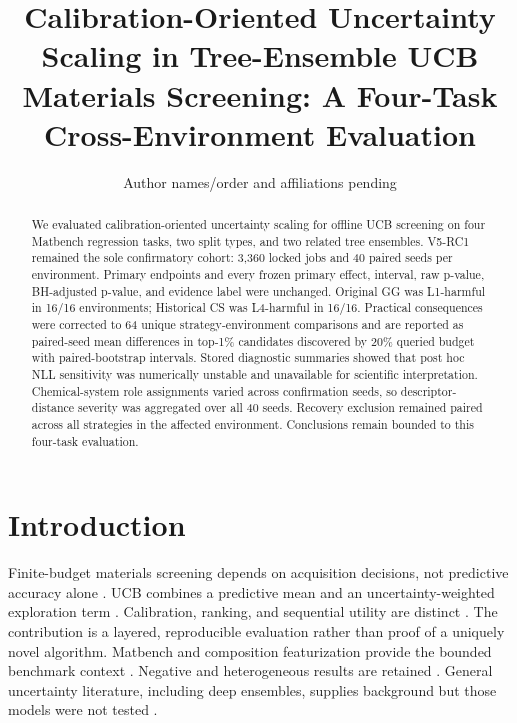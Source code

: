 \documentclass[10pt]{article}
\title{Calibration-Oriented Uncertainty Scaling in Tree-Ensemble UCB Materials Screening: A Four-Task Cross-Environment Evaluation}
\author{Author names/order and affiliations pending}
\date{}
\begin{document}
\maketitle
\begin{abstract}
We evaluated calibration-oriented uncertainty scaling for offline UCB screening
on four Matbench regression tasks, two split types, and two related tree
ensembles. V5-RC1 remained the sole confirmatory cohort: 3,360 locked jobs and
40 paired seeds per environment. Primary endpoints and every frozen primary
effect, interval, raw p-value, BH-adjusted p-value, and evidence label were
unchanged. Original GG was L1-harmful in 16/16 environments; Historical CS was
L4-harmful in 16/16. Practical consequences were corrected to 64 unique
strategy-environment comparisons and are reported as paired-seed mean
differences in top-1\% candidates discovered by 20\% queried budget with
paired-bootstrap intervals. Stored diagnostic summaries showed that post hoc
NLL sensitivity was numerically unstable and unavailable for scientific
interpretation. Chemical-system role assignments varied across confirmation
seeds, so descriptor-distance severity was aggregated over all 40 seeds.
Recovery exclusion remained paired across all strategies in the affected
environment. Conclusions remain bounded to this four-task evaluation.
\end{abstract}

\section{Introduction}
Finite-budget materials screening depends on acquisition decisions, not predictive accuracy alone \citep{lookman2019active,xue2016adaptive,kusne2020closedloop,rohr2020metrics,hase2021olympus}. UCB combines a predictive mean and an uncertainty-weighted exploration term \citep{auer2002ucb,srinivas2010gpucb,shahriari2016bo,frazier2018tutorial}. Calibration, ranking, and sequential utility are distinct \citep{gneiting2007proper,kuleshov2018calibrated,guo2017calibration,angelopoulos2023conformal,mandi2022decision,wilder2019decision,donti2017task}. The contribution is a layered, reproducible evaluation rather than proof of a uniquely novel algorithm. Matbench and composition featurization provide the bounded benchmark context \citep{dunn2020matbench,ward2018matminer,butler2018mlmaterials}. Negative and heterogeneous results are retained \citep{fanelli2012negative,liang2021benchmark}. General uncertainty literature, including deep ensembles, supplies background but those models were not tested \citep{lakshminarayanan2017ensembles}.
\end{document}

